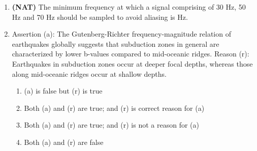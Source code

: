 \documentclass[journal,12pt,onecolumn]{IEEEtran}
\theoremstyle{remark}
\begin{document}
\begin{enumerate}
\begin{multicols}{4}
\begin{enumerate}
\item \( -\cos(\omega t) \)  
\item \( -\sin(\omega t) \)  
\item \( e^{i\omega t} \)  
\item \( -i e^{i\omega t} \)  
\end{enumerate}
\end{multicols}

\item \textbf{(NAT)} The minimum frequency at which a signal comprising of 30 Hz, 50 Hz and 70 Hz should be sampled to avoid aliasing is \underline{\hspace{2cm}} Hz.
\vspace{0.5cm}
\item Assertion (a): The Gutenberg-Richter frequency-magnitude relation of earthquakes globally suggests that subduction zones in general are characterized by lower b-values compared to mid-oceanic ridges.  
Reason (r): Earthquakes in subduction zones occur at deeper focal depths, whereas those along mid-oceanic ridges occur at shallow depths.

\begin{enumerate}
\item (a) is false but (r) is true  
\item Both (a) and (r) are true; and (r) is correct reason for (a)  
\item Both (a) and (r) are true; and (r) is not a reason for (a)  
\item Both (a) and (r) are false  
\end{enumerate}

\end{enumerate}
\end{document}
